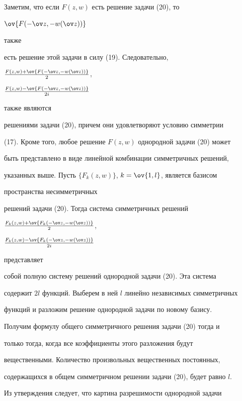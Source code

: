 \medskip 


 


\begin{pf} 


Заметим, что если $F(z,w)$ есть решение задачи (20), то 


$\ov{F(-\ov z,-w(\ov z))}$ 


также 


есть решение этой задачи в силу (19). Следовательно, 


$\frac{F(z,w)+\ov{F(-\ov z,-w(\ov z))}}{2}$, 


$\frac{F(z,w)-\ov{F(-\ov z,-w(\ov z))}}{2i}$ 


также являются 


решениями задачи (20), причем они удовлетворяют условию симметрии 


(17). Кроме того, любое решение $F(z,w)$ однородной задачи (20) может 


быть представлено в виде линейной комбинации симметричных решений, 


указанных выше. Пусть $\{F_k(z,w)\}$, $k=\ov{1,l}$, является базисом 


пространства несимметричных 


решений задачи (20). Тогда система симметричных решений 


$\frac{F_k(z,w)+\ov{F_k(-\ov z,-w(\ov z))}}{2}$, 


$\frac{F_k(z,w)-\ov{F_k(-\ov z,-w(\ov z))}}{2i}$ 


представляет 


собой полную систему решений однородной задачи (20). Эта система 


содержит $2l$ функций. Выберем в ней $l$ линейно независимых симметричных 


функций и разложим решение однородной задачи по новому базису. 


Получим формулу общего симметричного решения задачи (20) тогда и 


только тогда, когда все коэффициенты этого разложения будут 


вещественными. Количество произвольных вещественных постоянных, 


содержащихся в общем симметричном решении задачи (20), будет равно $l$. 


\end{pf} 


 


Из утверждения следует, что картина разрешимости однородной задачи 


